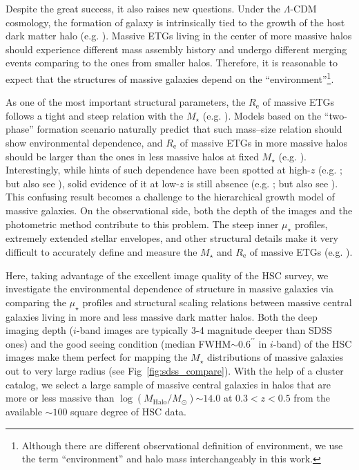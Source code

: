 \documentclass[a4paper,fleqn,usenatbib]{mnras}
\def\arcsec{{\prime\prime}}
\def\mstar{{$M_{\star}$}}
\def\logmh{{$\log (M_{\mathrm{Halo}}/M_{\odot})$}}
\def\mden{{$\mu_{\star}$}}
\begin{document}
    Despite the great success, it also raises new questions. 
    Under the $\Lambda$-CDM cosmology, the formation of galaxy is intrinsically 
    tied to the growth of the host dark matter halo 
    (e.g. \citealt{Leauthaud2012, Behroozi2013}).
    Massive ETGs living in the center of more massive halos should experience 
    different mass assembly history and undergo different merging events comparing 
    to the ones from smaller halos. 
    Therefore, it is reasonable to expect that the structures of massive galaxies
    depend on the ``environment''\footnote{Although there are different 
    observational definition of environment, we use the term ``environment'' and 
    halo mass interchangeably in this work.}.
    
    As one of the most important structural parameters, the $R_{\mathrm{e}}$ of 
    massive ETGs follows a tight and steep relation with the \mstar{} 
    (e.g. \citealt{Shen2003, Guo2009}). 
    Models based on the ``two-phase'' formation scenario naturally predict that 
    such mass--size relation should show environmental dependence, and 
    $R_{\mathrm{e}}$ of massive ETGs in more massive halos should be larger 
    than the ones in less massive halos at fixed \mstar{} 
    (e.g. \citealt{Shankar2013, Shankar2014}). 
    Interestingly, while hints of such dependence have been spotted at high-$z$ 
    (e.g. \citealt{Papovich2012, Lani2013, Delaye2014}; but also see 
    \citealt{Rettura2010}), solid evidence of it at low-$z$ is still absence 
    (e.g. \citealt{Nair2010, HCompany13}; but also see \citealt{Yoon2017}).
    This confusing result becomes a challenge to the hierarchical growth model 
    of massive galaxies. 
    On the observational side, both the depth of the images and the photometric 
    method contribute to this problem. 
    The steep inner \mden{} profiles, extremely extended stellar envelopes, 
    and other structural details make it very difficult to accurately define and 
    measure the \mstar{} and $R_{\mathrm{e}}$ of massive ETGs 
    (e.g. \citealt{Bernardi2013, DSouza2014}). 
       
    Here, taking advantage of the excellent image quality of the HSC survey, we 
    investigate the environmental dependence of structure in massive galaxies 
    via comparing the \mden{} profiles and structural scaling relations between 
    massive central galaxies living in more and less massive dark matter halos. 
    Both the deep imaging depth ($i$-band images are typically 3-4 magnitude deeper 
    than SDSS ones) and the good seeing condition (median FWHM$\sim 0.6^{\arcsec}$
    in $i$-band) of the HSC images make them perfect for mapping the \mstar{}
    distributions of massive galaxies out to very large radius (see 
    Fig~\ref{fig:sdss_compare}). 
    With the help of a cluster catalog, we select a large sample of massive central 
    galaxies in halos that are more or less massive than \logmh{}$\sim 14.0$ at 
    $0.3 < z < 0.5$ from the available $\sim 100$ square degree of HSC data.
    
\end{document}
